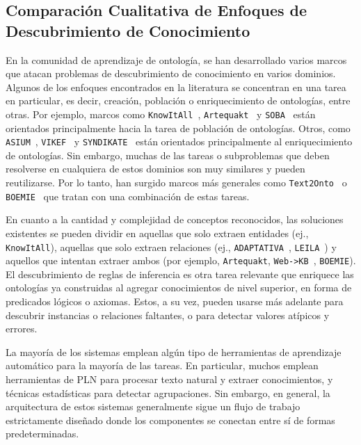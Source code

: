 \subsection{Comparación Cualitativa de Enfoques de Descubrimiento de Conocimiento}

En la comunidad de aprendizaje de ontología, se han desarrollado varios marcos que atacan problemas de descubrimiento de conocimiento en varios dominios.
Algunos de los enfoques encontrados en la literatura se concentran en una tarea en particular, es decir, creación, población o enriquecimiento de ontologías, entre otras.
Por ejemplo, marcos como \texttt{KnowItAll}~\cite{knowitall}, \texttt{Artequakt}~\cite{artequakt} y \texttt{SOBA}~\cite{soba} están orientados principalmente hacia la tarea de población de ontologías.
Otros, como \texttt{ASIUM}~\cite{asium}, \texttt{VIKEF}~\cite{vikef} y \texttt{SYNDIKATE}~\cite{syndikate} están orientados principalmente al enriquecimiento de ontologías.
Sin embargo, muchas de las tareas o subproblemas que deben resolverse en cualquiera de estos dominios son muy similares y pueden reutilizarse.
Por lo tanto, han surgido marcos más generales como \texttt{Text2Onto}~\cite{cimiano2005text2onto} o \texttt{BOEMIE}~\cite{boemie} que tratan con una combinación de estas tareas.

En cuanto a la cantidad y complejidad de conceptos reconocidos, las soluciones existentes se pueden dividir en aquellas que solo extraen entidades (ej., \texttt{KnowItAll}), aquellas que solo extraen relaciones (ej., \texttt{ADAPTATIVA}~\cite{adaptativa}, \texttt{LEILA}~\cite{leila}) y aquellos que intentan extraer ambos (por ejemplo, \texttt{Artequakt}, \texttt{Web->KB}~\cite{webkb}, \texttt{BOEMIE}).
El descubrimiento de reglas de inferencia es otra tarea relevante que enriquece las ontologías ya construidas al agregar conocimientos de nivel superior, en forma de predicados lógicos o axiomas.
Estos, a su vez, pueden usarse más adelante para descubrir instancias o relaciones faltantes, o para detectar valores atípicos y errores.

La mayoría de los sistemas emplean algún tipo de herramientas de aprendizaje automático para la mayoría de las tareas.
En particular, muchos emplean herramientas de PLN para procesar texto natural y extraer conocimientos, y técnicas estadísticas para detectar agrupaciones.
Sin embargo, en general, la arquitectura de estos sistemas generalmente sigue un flujo de trabajo estrictamente diseñado donde los componentes se conectan entre sí de formas predeterminadas.

